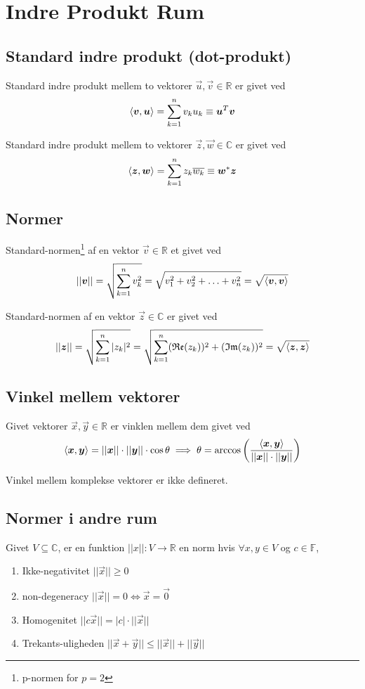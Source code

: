 \section{Indre Produkt Rum}

\subsection{Standard indre produkt (dot-produkt)}
Standard indre produkt mellem to vektorer $\vec u, \vec v \in \mathbb R$ er givet ved
\[
\left \langle \boldsymbol{v}, \boldsymbol{u} \right \rangle
= \sum_{k=1}^n v_k u_k
\equiv \boldsymbol{u}^T \boldsymbol{v}
\]

Standard indre produkt mellem to vektorer $\vec z, \vec w \in \mathbb C$ er givet ved
\[
\left \langle \boldsymbol{z}, \boldsymbol{w} \right \rangle 
= \sum_{k=1}^n z_k \overline{w_k}
\equiv \boldsymbol{w}^* \boldsymbol{z}
\]


\subsection{Normer}
Standard-normen\footnote{p-normen for $p=2$} af en vektor $\vec v \in \mathbb R$ et givet ved
\[
|| \boldsymbol{v} || 
= \sqrt{\sum_{k=1}^n v_k^2}
= \sqrt{v_1^2 + v_2^2 + \ldots + v_n^2}
= \sqrt{\left \langle \boldsymbol{v}, \boldsymbol{v} \right \rangle}
\]

Standard-normen af en vektor $\vec z \in \mathbb C$ er givet ved
\[
|| \boldsymbol{z} ||
= \sqrt{\sum_{k=1}^n |z_k|^2}
= \sqrt{\sum_{k=1}^n (\mathfrak{Re}{(z_k)})^2 + (\mathfrak{Im}{(z_k)})^2}
= \sqrt{\left \langle \boldsymbol{z}, \boldsymbol{z} \right \rangle}
\]

\subsection{Vinkel mellem vektorer}
Givet vektorer $\vec x, \vec y \in \mathbb R$ er vinklen mellem dem givet ved
\[
\left \langle \boldsymbol{x}, \boldsymbol{y} \right \rangle = ||\boldsymbol{x}|| \cdot ||\boldsymbol{y}|| \cdot \cos \theta
\implies
\theta = \arccos \left( \frac{\left \langle \boldsymbol{x}, \boldsymbol{y} \right \rangle}{||\boldsymbol{x}|| \cdot ||\boldsymbol{y}||} \right)
\]

Vinkel mellem komplekse vektorer er ikke defineret.

\subsection{Normer i andre rum}
Givet $V \subseteq \mathbb C$, er en funktion $||x||: V \to \mathbb R$ en norm hvis $\forall x, y \in V$ og $c \in \mathbb F$,
\begin{enumerate}
    \item Ikke-negativitet $||\vec x|| \geq 0$ 
    \item non-degeneracy $||\vec x|| = 0 \iff \vec x = \vec 0$
    \item Homogenitet $||c \vec x|| = |c| \cdot ||\vec x||$
    \item Trekants-uligheden $||\vec x + \vec y|| \leq ||\vec x|| + ||\vec y||$
\end{enumerate}

